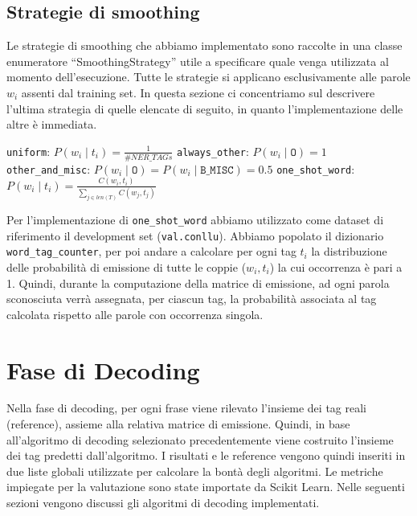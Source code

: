 \documentclass[a4paper,11pt,notitlepage]{report}
\begin{document}
\section{Strategie di smoothing}
Le strategie di smoothing che abbiamo implementato sono raccolte in una classe enumeratore ``SmoothingStrategy'' utile a specificare quale venga utilizzata al momento dell'esecuzione. Tutte le strategie si applicano esclusivamente alle parole $w_i$ assenti dal training set.
In questa sezione ci concentriamo sul descrivere l'ultima strategia di quelle elencate di seguito, in quanto l'implementazione delle altre è immediata.

\begin{outline}[enumerate]
    \1 \texttt{uniform}: $P(w_i \mid t_i) = \frac{1}{\#NER\_TAGs}$
    \1 \texttt{always\_other}: $P(w_i \mid \mathtt{O}) = 1$
    \1 \texttt{other\_and\_misc}: $P(w_i \mid \mathtt{O}) = P(w_i \mid \mathtt{B\_MISC}) = 0.5$
    \1 \texttt{one\_shot\_word}: {$P(w_i \mid t_i) = \frac{C(w_i,t_i)}{\sum_{j \in len(T)}{C(w_j,t_j)}}$}
\end{outline}
Per l'implementazione di \texttt{one\_shot\_word} abbiamo utilizzato come dataset di riferimento il development set (\texttt{val.conllu}). Abbiamo popolato il dizionario \texttt{word\_tag\_counter}, per poi andare a calcolare per ogni tag $t_i$ la distribuzione delle probabilità di emissione di tutte le coppie ($w_i,t_i$) la cui occorrenza è pari a 1. Quindi, durante la computazione della matrice di emissione, ad ogni parola sconosciuta verrà assegnata, per ciascun tag, la probabilità associata al tag calcolata rispetto alle parole con occorrenza singola.


\chapter{Fase di Decoding}
Nella fase di decoding, per ogni frase viene rilevato l'insieme dei tag reali (reference), assieme alla relativa matrice di emissione. Quindi, in base all'algoritmo di decoding selezionato precedentemente viene costruito l'insieme dei tag predetti dall'algoritmo. I risultati e le reference vengono quindi inseriti in due liste globali utilizzate per calcolare la bontà degli algoritmi. Le metriche impiegate per la valutazione sono state importate da Scikit Learn.
Nelle seguenti sezioni vengono discussi gli algoritmi di decoding implementati.
\end{document}

